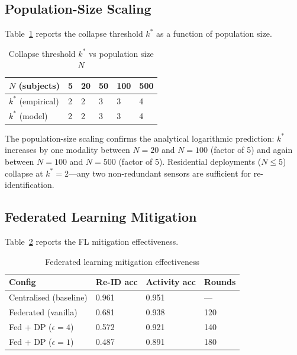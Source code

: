\documentclass[sigconf,nonacm]{acmart}
\begin{document}
\subsection{Population-Size Scaling}

Table~\ref{tab:popscale} reports the collapse threshold $k^*$
as a function of population size.

\begin{table}[h]
\caption{Collapse threshold $k^*$ vs population size $N$}
\label{tab:popscale}
\small
\begin{tabularx}{\columnwidth}{@{}p{1.8cm}X X X X X@{}}
\toprule
\textbf{$N$ (subjects)} & 5 & 20 & 50 & 100 & 500 \\
\midrule
$k^*$ (empirical) & 2 & 2 & 3 & 3 & 4 \\
$k^*$ (model)     & 2 & 2 & 3 & 3 & 4 \\
\bottomrule
\end{tabularx}
\end{table}

The population-size scaling confirms the analytical logarithmic
prediction: $k^*$ increases by one modality between $N = 20$
and $N = 100$ (factor of 5) and again between $N = 100$ and
$N = 500$ (factor of 5). Residential deployments ($N \leq 5$)
collapse at $k^* = 2$---any two non-redundant sensors are
sufficient for re-identification.

\subsection{Federated Learning Mitigation}

Table~\ref{tab:fl} reports the FL mitigation effectiveness.

\begin{table}[h]
\caption{Federated learning mitigation effectiveness}
\label{tab:fl}
\small
\begin{tabularx}{\columnwidth}{@{}p{2.8cm}X X X@{}}
\toprule
\textbf{Config} & \textbf{Re-ID acc} & \textbf{Activity acc} & \textbf{Rounds} \\
\midrule
Centralised (baseline) & 0.961 & 0.951 & --- \\
Federated (vanilla)    & 0.681 & 0.938 & 120 \\
Fed + DP ($\epsilon=4$)& 0.572 & 0.921 & 140 \\
Fed + DP ($\epsilon=1$)& 0.487 & 0.891 & 180 \\
\bottomrule
\end{tabularx}
\end{table}
\end{document}
